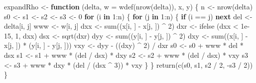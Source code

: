 \documentclass[
  12pt,
  letterpaper,
  DIV=11,
  numbers=noendperiod]{scrreprt}
\newenvironment{Shaded}{\begin{snugshade}}{\end{snugshade}}
\newcommand{\AttributeTok}[1]{\textcolor[rgb]{0.40,0.45,0.13}{#1}}
\newcommand{\ControlFlowTok}[1]{\textcolor[rgb]{0.00,0.23,0.31}{\textbf{#1}}}
\newcommand{\DecValTok}[1]{\textcolor[rgb]{0.68,0.00,0.00}{#1}}
\newcommand{\FloatTok}[1]{\textcolor[rgb]{0.68,0.00,0.00}{#1}}
\newcommand{\FunctionTok}[1]{\textcolor[rgb]{0.28,0.35,0.67}{#1}}
\newcommand{\NormalTok}[1]{\textcolor[rgb]{0.00,0.23,0.31}{#1}}
\newcommand{\OtherTok}[1]{\textcolor[rgb]{0.00,0.23,0.31}{#1}}
\newcommand{\SpecialCharTok}[1]{\textcolor[rgb]{0.37,0.37,0.37}{#1}}
\theoremstyle{remark}
\begin{document}
\begin{Shaded}
\begin{Highlighting}[]
\NormalTok{expandRho }\OtherTok{\textless{}{-}} \ControlFlowTok{function}\NormalTok{ (delta, }\AttributeTok{w =} \FunctionTok{wdef}\NormalTok{(}\FunctionTok{nrow}\NormalTok{(delta)), x, y) \{}
\NormalTok{  n }\OtherTok{\textless{}{-}} \FunctionTok{nrow}\NormalTok{(delta)}
\NormalTok{  s0 }\OtherTok{\textless{}{-}}\NormalTok{ s1 }\OtherTok{\textless{}{-}}\NormalTok{ s2 }\OtherTok{\textless{}{-}}\NormalTok{ s3 }\OtherTok{\textless{}{-}} \DecValTok{0}
  \ControlFlowTok{for}\NormalTok{ (i }\ControlFlowTok{in} \DecValTok{1}\SpecialCharTok{:}\NormalTok{n) \{}
    \ControlFlowTok{for}\NormalTok{ (j }\ControlFlowTok{in} \DecValTok{1}\SpecialCharTok{:}\NormalTok{n) \{}
      \ControlFlowTok{if}\NormalTok{ (i }\SpecialCharTok{==}\NormalTok{ j)}
        \ControlFlowTok{next}
\NormalTok{      del }\OtherTok{\textless{}{-}}\NormalTok{ delta[i, j]}
\NormalTok{      www }\OtherTok{\textless{}{-}}\NormalTok{ w[i, j]}
\NormalTok{      dxx }\OtherTok{\textless{}{-}} \FunctionTok{sum}\NormalTok{((x[i, ] }\SpecialCharTok{{-}}\NormalTok{ x[j, ]) }\SpecialCharTok{\^{}} \DecValTok{2}\NormalTok{)}
\NormalTok{      dxr }\OtherTok{\textless{}{-}} \FunctionTok{ifelse}\NormalTok{ (dxx }\SpecialCharTok{\textless{}} \FloatTok{1e{-}15}\NormalTok{, }\DecValTok{1}\NormalTok{, dxx)}
\NormalTok{      dsx }\OtherTok{\textless{}{-}} \FunctionTok{sqrt}\NormalTok{(dxr)}
\NormalTok{      dyy }\OtherTok{\textless{}{-}} \FunctionTok{sum}\NormalTok{((y[i, ] }\SpecialCharTok{{-}}\NormalTok{ y[j, ]) }\SpecialCharTok{\^{}} \DecValTok{2}\NormalTok{)}
\NormalTok{      dxy }\OtherTok{\textless{}{-}} \FunctionTok{sum}\NormalTok{((x[i, ] }\SpecialCharTok{{-}}\NormalTok{ x[j, ]) }\SpecialCharTok{*}\NormalTok{ (y[i, ] }\SpecialCharTok{{-}}\NormalTok{ y[j, ]))}
\NormalTok{      vxy }\OtherTok{\textless{}{-}}\NormalTok{ dyy }\SpecialCharTok{{-}}\NormalTok{ ((dxy) }\SpecialCharTok{\^{}} \DecValTok{2}\NormalTok{) }\SpecialCharTok{/}\NormalTok{ dxr}
\NormalTok{      s0 }\OtherTok{\textless{}{-}}\NormalTok{ s0 }\SpecialCharTok{+}\NormalTok{ www }\SpecialCharTok{*}\NormalTok{ del }\SpecialCharTok{*}\NormalTok{ dsx}
\NormalTok{      s1 }\OtherTok{\textless{}{-}}\NormalTok{ s1 }\SpecialCharTok{+}\NormalTok{ www }\SpecialCharTok{*}\NormalTok{ (del }\SpecialCharTok{/}\NormalTok{ dsx) }\SpecialCharTok{*}\NormalTok{ dxy}
\NormalTok{      s2 }\OtherTok{\textless{}{-}}\NormalTok{ s2 }\SpecialCharTok{+}\NormalTok{ www }\SpecialCharTok{*}\NormalTok{ (del }\SpecialCharTok{/}\NormalTok{ dsx) }\SpecialCharTok{*}\NormalTok{ vxy}
\NormalTok{      s3 }\OtherTok{\textless{}{-}}\NormalTok{ s3 }\SpecialCharTok{+}\NormalTok{ www }\SpecialCharTok{*}\NormalTok{ dxy }\SpecialCharTok{*}\NormalTok{ (del }\SpecialCharTok{/}\NormalTok{ (dsx }\SpecialCharTok{\^{}} \DecValTok{3}\NormalTok{)) }\SpecialCharTok{*}\NormalTok{ vxy}
\NormalTok{    \}}
\NormalTok{  \}}
  \FunctionTok{return}\NormalTok{(}\FunctionTok{c}\NormalTok{(s0, s1, s2 }\SpecialCharTok{/} \DecValTok{2}\NormalTok{, }\SpecialCharTok{{-}}\NormalTok{s3 }\SpecialCharTok{/} \DecValTok{2}\NormalTok{))}
\NormalTok{\}}


\end{Highlighting}
\end{Shaded}
\end{document}
